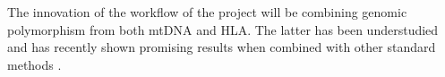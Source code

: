 \documentclass[10pt]{article}
\begin{document}
The innovation of the workflow of the project will be combining genomic polymorphism from both mtDNA and HLA. The latter has been understudied and has recently shown promising results when combined with other standard methods \cite{Kuffel2019}. 








\printbibliography
\end{document}
